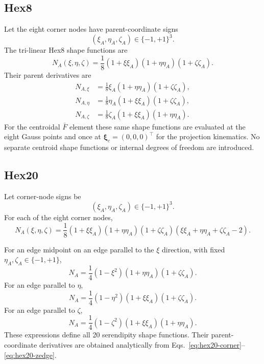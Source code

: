 \documentclass[11pt,a4paper]{article}
\newcommand{\bs}[1]{\boldsymbol{#1}}
\begin{document}
\subsection{Hex8}

Let the eight corner nodes have parent-coordinate signs
\begin{equation}
(\xi_A,\eta_A,\zeta_A)\in\{-1,+1\}^3.
\end{equation}
The tri-linear Hex8 shape functions are
\begin{equation}
\boxed{
N_A(\xi,\eta,\zeta)
=\frac18
(1+\xi\xi_A)
(1+\eta\eta_A)
(1+\zeta\zeta_A).
}
\label{eq:hex8-shape}
\end{equation}
Their parent derivatives are
\begin{align}
N_{A,\xi}&=\frac18\xi_A(1+\eta\eta_A)(1+\zeta\zeta_A),\\
N_{A,\eta}&=\frac18\eta_A(1+\xi\xi_A)(1+\zeta\zeta_A),\\
N_{A,\zeta}&=\frac18\zeta_A(1+\xi\xi_A)(1+\eta\eta_A).
\end{align}
For the centroidal $\bar F$ element these same shape functions are evaluated at the eight Gauss points and once at $\bs\xi_c=(0,0,0)^\top$ for the projection kinematics. No separate centroid shape functions or internal degrees of freedom are introduced.

\subsection{Hex20}

Let corner-node signs be
\begin{equation}
(\xi_A,\eta_A,\zeta_A)\in\{-1,+1\}^3.
\end{equation}
For each of the eight corner nodes,
\begin{equation}
\boxed{
N_A(\xi,\eta,\zeta)
=\frac{1}{8}
(1+\xi\xi_A)
(1+\eta\eta_A)
(1+\zeta\zeta_A)
(\xi\xi_A+\eta\eta_A+\zeta\zeta_A-2).
}
\label{eq:hex20-corner}
\end{equation}

For an edge midpoint on an edge parallel to the $\xi$ direction, with fixed $\eta_A,\zeta_A\in\{-1,+1\}$,
\begin{equation}
\boxed{
N_A
=\frac{1}{4}(1-\xi^2)(1+\eta\eta_A)(1+\zeta\zeta_A).
}
\label{eq:hex20-xedge}
\end{equation}
For an edge parallel to $\eta$,
\begin{equation}
\boxed{
N_A
=\frac{1}{4}(1-\eta^2)(1+\xi\xi_A)(1+\zeta\zeta_A).
}
\label{eq:hex20-yedge}
\end{equation}
For an edge parallel to $\zeta$,
\begin{equation}
\boxed{
N_A
=\frac{1}{4}(1-\zeta^2)(1+\xi\xi_A)(1+\eta\eta_A).
}
\label{eq:hex20-zedge}
\end{equation}
These expressions define all 20 serendipity shape functions. Their parent-coordinate derivatives are obtained analytically from Eqs.~\eqref{eq:hex20-corner}--\eqref{eq:hex20-zedge}.
\end{document}
